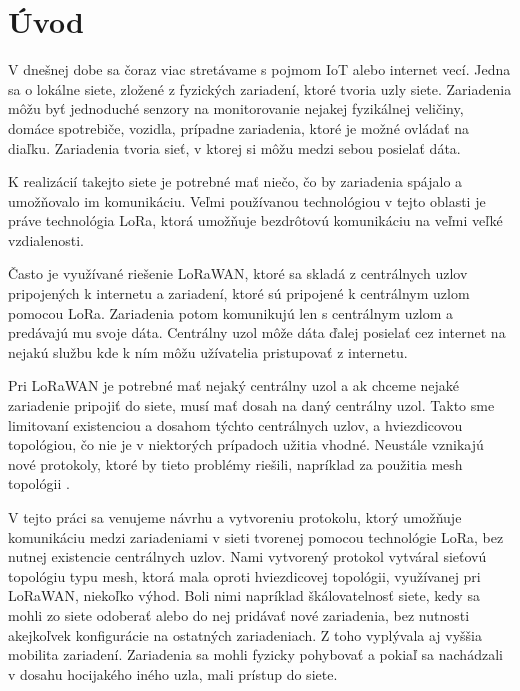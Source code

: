 \documentclass[slovak,master]{diploma}
\begin{document}
\MakeTitlePages

\listoffigures
\clearpage

\listoftables
\clearpage

\chapter{Úvod}
V dnešnej dobe sa čoraz viac stretávame s pojmom IoT alebo internet vecí. Jedna sa o lokálne siete, zložené z fyzických zariadení, ktoré tvoria uzly siete.
Zariadenia môžu byť jednoduché senzory na monitorovanie nejakej fyzikálnej veličiny, domáce spotrebiče, vozidla, prípadne 
zariadenia, ktoré je možné ovládať na diaľku. Zariadenia tvoria sieť, v ktorej si môžu medzi sebou posielať 
dáta.

K realizácií takejto siete je potrebné mať niečo, čo by zariadenia spájalo a umožňovalo im komunikáciu. Veľmi používanou technológiou
v tejto oblasti je práve technológia LoRa, ktorá umožňuje bezdrôtovú komunikáciu na veľmi veľké vzdialenosti.

Často je využívané riešenie LoRaWAN, ktoré sa skladá z centrálnych uzlov pripojených k internetu a zariadení, ktoré sú pripojené k centrálnym uzlom pomocou LoRa. 
Zariadenia potom komunikujú len s centrálnym uzlom a predávajú mu svoje dáta. Centrálny uzol môže dáta ďalej posielať cez internet na nejakú službu kde 
k ním môžu užívatelia pristupovať z internetu.

Pri LoRaWAN je potrebné mať nejaký centrálny uzol a ak chceme nejaké zariadenie pripojiť do siete, musí mať dosah na daný centrálny uzol. 
Takto sme limitovaní existenciou a dosahom týchto centrálnych uzlov, a hviezdicovou topológiou, čo nie je v niektorých prípadoch užitia vhodné. Neustále vznikajú nové 
protokoly, ktoré by tieto problémy riešili, napríklad za použitia mesh topológii \cite{9385408}.

V tejto práci sa venujeme návrhu a vytvoreniu protokolu, ktorý umožňuje komunikáciu medzi zariadeniami v sieti tvorenej pomocou technológie LoRa,
bez nutnej existencie centrálnych uzlov. Nami vytvorený protokol vytváral sieťovú topológiu typu mesh, ktorá mala oproti hviezdicovej topológii, 
využívanej pri LoRaWAN, niekoľko výhod. Boli nimi napríklad škálovatelnosť siete, kedy sa mohli zo siete odoberať alebo do nej pridávať nové zariadenia, 
bez nutnosti akejkoľvek konfigurácie na ostatných zariadeniach. Z toho vyplývala aj vyššia mobilita zariadení. Zariadenia sa mohli fyzicky pohybovať a 
pokiaľ sa nachádzali v dosahu hocijakého iného uzla, mali prístup do siete.
\end{document}
